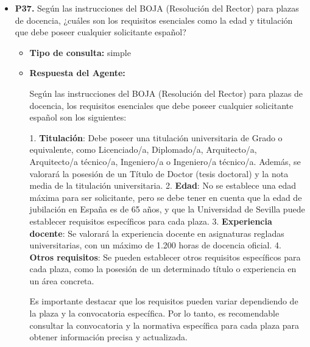 \documentclass{article}
\begin{document}
\begin{itemize}
\begin{itemize}
\begin{scriptsize}
                  Código Seguro De Verificación: `eqOjhZcmL0p6VJlZiTH/Yw==`
                  Fecha: 27/06/2025
                  Firmado Por: MIGUEL ANGEL CASTRO ARROYO
                  Url De Verificación: [https://pfirma.us.es/verifirma/code/eqOjhZcmL0p6VJlZiTH\%2FYw\%3D\%3D](https://pfirma.us.es/verifirma/code/eqOjhZcmL0p6VJlZiTH\%2FYw\%3D\%3D)
                  Página: 7/50
                \end{scriptsize}
        \end{itemize}


  \item \textbf{P37.} Según las instrucciones del BOJA (Resolución del Rector) para plazas de docencia, ¿cuáles son los requisitos esenciales como la edad y titulación que debe poseer cualquier solicitante español? \\
        \begin{itemize}
          \item \textbf{Tipo de consulta:} simple
          \item \textbf{Respuesta del Agente:}

                Según las instrucciones del BOJA (Resolución del Rector) para plazas de docencia, los requisitos esenciales que debe poseer cualquier solicitante español son los siguientes:

                1. \textbf{Titulación}: Debe poseer una titulación universitaria de Grado o equivalente, como Licenciado/a, Diplomado/a, Arquitecto/a, Arquitecto/a técnico/a, Ingeniero/a o Ingeniero/a técnico/a. Además, se valorará la posesión de un Título de Doctor (tesis doctoral) y la nota media de la titulación universitaria.
                2. \textbf{Edad}: No se establece una edad máxima para ser solicitante, pero se debe tener en cuenta que la edad de jubilación en España es de 65 años, y que la Universidad de Sevilla puede establecer requisitos específicos para cada plaza.
                3. \textbf{Experiencia docente}: Se valorará la experiencia docente en asignaturas regladas universitarias, con un máximo de 1.200 horas de docencia oficial.
                4. \textbf{Otros requisitos}: Se pueden establecer otros requisitos específicos para cada plaza, como la posesión de un determinado título o experiencia en un área concreta.

                Es importante destacar que los requisitos pueden variar dependiendo de la plaza y la convocatoria específica. Por lo tanto, es recomendable consultar la convocatoria y la normativa específica para cada plaza para obtener información precisa y actualizada.


\end{itemize}
\end{itemize}
\end{document}

